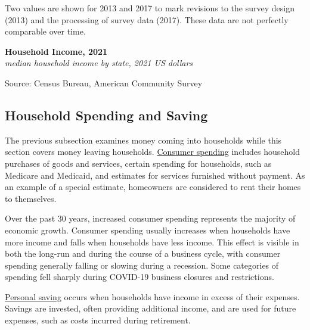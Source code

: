 \documentclass{report}
\newcommand{\tbllink}[1]{\href{https://raw.githubusercontent.com/bdecon/US-chartbook/master/chartbook/data/#1}{\faTable}}
\begin{document}
{\begin{minipage}{0.345\textwidth}
Two values are shown for 2013 and 2017 to mark revisions to the survey design (2013) and the processing of survey data (2017). These data are not perfectly comparable over time. 
\end{minipage}
\newpage
\begin{minipage}{0.76\textwidth}
\small 
\end{minipage}
\vspace{1mm}

\normalsize \textbf{Household Income, 2021}\\
\footnotesize{\textit{median household income by state, 2021 US dollars}}
\vspace{-3mm}

\hspace{-5mm} 
\vspace{-6mm}

\begin{minipage}{0.76\textwidth} 
\footnotesize{Source: Census Bureau, American Community Survey} \hfill \tbllink{median_hh_inc_state.csv}
\end{minipage}
\newpage 
\begin{minipage}{0.76\textwidth}
\subsection*{Household Spending and Saving}
\hypertarget{hhss}{}
\small The previous subsection examines money coming into households while this section covers money leaving households. \href{https://www.bea.gov/data/consumer-spending/main}{Consumer spending} includes household purchases of goods and services, certain spending for households, such as Medicare and Medicaid, and estimates for services furnished without payment. As an example of a special estimate, homeowners are considered to rent their homes to themselves. 

Over the past 30 years, increased consumer spending represents the majority of economic growth. Consumer spending usually increases when households have more income and falls when households have less income. This effect is visible in both the long-run and during the course of a business cycle, with consumer spending generally falling or slowing during a recession. Some categories of spending fell sharply during COVID-19 business closures and restrictions.

\href{https://www.bea.gov/data/income-saving/personal-saving-rate}{Personal saving} occurs when households have income in excess of their expenses. Savings are invested, often providing additional income, and are used for future expenses, such as costs incurred during retirement.


\end{minipage}}
\end{document}
